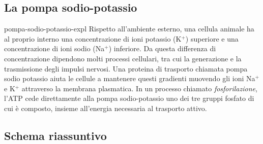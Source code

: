 \documentclass[preview]{standalone}
\begin{document}

\subsection{La pompa sodio-potassio}

\begin{snippet}{pompa-sodio-potassio-expl}
    Rispetto all'ambiente esterno, una cellula animale ha al proprio interno una concentrazione
    di ioni potassio (K\({}^+\)) superiore e una concentrazione di ioni sodio (Na\({}^+\)) inferiore. Da questa
    differenza di concentrazione dipendono molti processi cellulari, tra cui la generazione e la
    trasmissione degli impulsi nervosi. Una proteina di trasporto chiamata pompa sodio potassio
    aiuta le cellule a mantenere questi gradienti muovendo gli ioni Na\({}^+\) e K\({}^+\) attraverso la
    membrana plasmatica. In un processo chiamato \textit{fosforilazione}, l'ATP cede direttamente alla
    pompa sodio-potassio uno dei tre gruppi fosfato di cui è composto, insieme all'energia
    necessaria al trasporto attivo.
\end{snippet}


\subsection{Schema riassuntivo}


\end{document}
